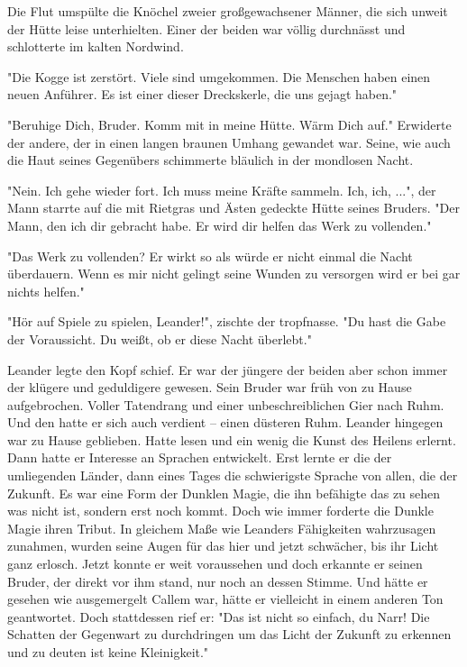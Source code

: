 \documentclass[10pt, a4paper, oneside]{book}
\begin{document}
\begin{multicols}{2}
Die Flut umspülte die Knöchel zweier großgewachsener Männer, die sich unweit der Hütte leise unterhielten. Einer der beiden war völlig durchnässt und schlotterte im kalten Nordwind.

"Die Kogge ist zerstört. Viele sind umgekommen. Die Menschen haben einen neuen Anführer. Es ist einer dieser Dreckskerle, die uns gejagt haben."

"Beruhige Dich, Bruder. Komm mit in meine Hütte. Wärm Dich auf." Erwiderte der andere, der in einen langen braunen Umhang gewandet war. Seine, wie auch die Haut seines Gegenübers schimmerte bläulich in der mondlosen Nacht.

"Nein. Ich gehe wieder fort. Ich muss meine Kräfte sammeln. Ich, ich, ...", der Mann starrte auf die mit Rietgras und Ästen gedeckte Hütte seines Bruders. "Der Mann, den ich dir gebracht habe. Er wird dir helfen das Werk zu vollenden."

"Das Werk zu vollenden? Er wirkt so als würde er nicht einmal die Nacht überdauern. Wenn es mir nicht gelingt seine Wunden zu versorgen wird er bei gar nichts helfen."

"Hör auf Spiele zu spielen, Leander!", zischte der tropfnasse. "Du hast die Gabe der Voraussicht. Du weißt, ob er diese Nacht überlebt."

Leander legte den Kopf schief. Er war der jüngere der beiden aber schon immer der klügere und geduldigere gewesen. Sein Bruder war früh von zu Hause aufgebrochen. Voller Tatendrang und einer unbeschreiblichen Gier nach Ruhm. Und den hatte er sich auch verdient – einen düsteren Ruhm.  Leander hingegen war zu Hause geblieben. Hatte lesen und ein wenig die Kunst des Heilens erlernt. Dann hatte er Interesse an Sprachen entwickelt. Erst lernte er die der umliegenden Länder, dann eines Tages die schwierigste Sprache von allen, die der Zukunft. Es war eine Form der Dunklen Magie, die ihn befähigte das zu sehen was nicht ist, sondern erst noch kommt. Doch wie immer forderte die Dunkle Magie ihren Tribut. In gleichem Maße wie Leanders Fähigkeiten wahrzusagen zunahmen, wurden seine Augen für das hier und jetzt schwächer, bis ihr Licht ganz erlosch. Jetzt konnte er weit voraussehen und doch erkannte er seinen Bruder, der direkt vor ihm stand, nur noch an dessen Stimme. Und hätte er gesehen wie ausgemergelt Callem war, hätte er vielleicht in einem anderen Ton geantwortet. Doch stattdessen rief er: "Das ist nicht so einfach, du Narr! Die Schatten der Gegenwart zu durchdringen um das Licht der Zukunft zu erkennen und zu deuten ist keine Kleinigkeit."




\end{multicols}
\end{document}
